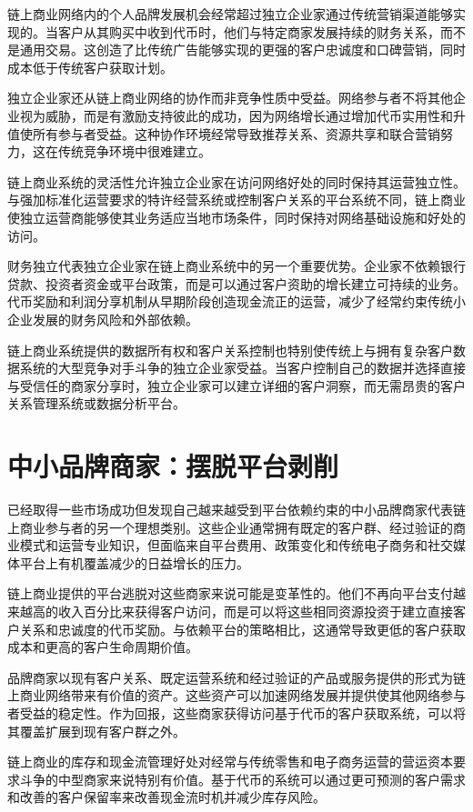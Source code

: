 \documentclass[
  Letterpaper,
]{scrbook}
\begin{document}
链上商业网络内的个人品牌发展机会经常超过独立企业家通过传统营销渠道能够实现的。当客户从其购买中收到代币时，他们与特定商家发展持续的财务关系，而不是通用交易。这创造了比传统广告能够实现的更强的客户忠诚度和口碑营销，同时成本低于传统客户获取计划。

独立企业家还从链上商业网络的协作而非竞争性质中受益。网络参与者不将其他企业视为威胁，而是有激励支持彼此的成功，因为网络增长通过增加代币实用性和升值使所有参与者受益。这种协作环境经常导致推荐关系、资源共享和联合营销努力，这在传统竞争环境中很难建立。

链上商业系统的灵活性允许独立企业家在访问网络好处的同时保持其运营独立性。与强加标准化运营要求的特许经营系统或控制客户关系的平台系统不同，链上商业使独立运营商能够使其业务适应当地市场条件，同时保持对网络基础设施和好处的访问。

财务独立代表独立企业家在链上商业系统中的另一个重要优势。企业家不依赖银行贷款、投资者资金或平台政策，而是可以通过客户资助的增长建立可持续的业务。代币奖励和利润分享机制从早期阶段创造现金流正的运营，减少了经常约束传统小企业发展的财务风险和外部依赖。

链上商业系统提供的数据所有权和客户关系控制也特别使传统上与拥有复杂客户数据系统的大型竞争对手斗争的独立企业家受益。当客户控制自己的数据并选择直接与受信任的商家分享时，独立企业家可以建立详细的客户洞察，而无需昂贵的客户关系管理系统或数据分析平台。

\section{中小品牌商家：摆脱平台剥削}\label{ux4e2dux5c0fux54c1ux724cux5546ux5bb6ux6446ux8131ux5e73ux53f0ux5265ux524a}

已经取得一些市场成功但发现自己越来越受到平台依赖约束的中小品牌商家代表链上商业参与者的另一个理想类别。这些企业通常拥有既定的客户群、经过验证的商业模式和运营专业知识，但面临来自平台费用、政策变化和传统电子商务和社交媒体平台上有机覆盖减少的日益增长的压力。

链上商业提供的平台逃脱对这些商家来说可能是变革性的。他们不再向平台支付越来越高的收入百分比来获得客户访问，而是可以将这些相同资源投资于建立直接客户关系和忠诚度的代币奖励。与依赖平台的策略相比，这通常导致更低的客户获取成本和更高的客户生命周期价值。

品牌商家以现有客户关系、既定运营系统和经过验证的产品或服务提供的形式为链上商业网络带来有价值的资产。这些资产可以加速网络发展并提供使其他网络参与者受益的稳定性。作为回报，这些商家获得访问基于代币的客户获取系统，可以将其覆盖扩展到现有客户群之外。

链上商业的库存和现金流管理好处对经常与传统零售和电子商务运营的营运资本要求斗争的中型商家来说特别有价值。基于代币的系统可以通过更可预测的客户需求和改善的客户保留率来改善现金流时机并减少库存风险。
\end{document}
